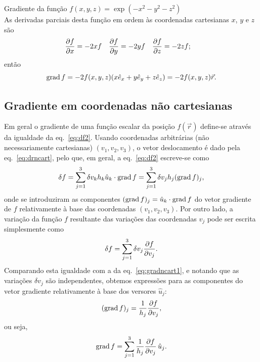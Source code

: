 \begin{examples}
\item Gradiente da função $f(x,y,z)=\exp(-x^2-y^2-z^2)$\\
\label{ex:gausgrad}
As derivadas parciais desta função em ordem às coordenadas cartesianas $x$, $y$
e $z$ são
\begin{align*}
\frac{\partial f}{\partial x}&=-2xf&
\frac{\partial f}{\partial y}&=-2yf&
\frac{\partial f}{\partial z}&=-2zf;
\end{align*}
então
\begin{equation*}
\grad f=-2f(x,y,z)(x\he_x+y\he_y+z\he_z)=-2f(x,y,z)\vec r.
\end{equation*}
\end{examples}

\subsection{Gradiente em coordenadas não cartesianas}
Em geral o gradiente de uma função escalar da posição $f(\vec r)$ define-se
através da igualdade da eq.~\eqref{eq:df2}. Usando coordenadas arbitrárias (não
necessariamente cartesianas) $(v_1,v_2,v_3)$, o vetor deslocamento é dado pela
eq.~\eqref{eq:drncart}, pelo que, em geral, a eq.~\eqref{eq:df2} escreve-se como
\begin{equation}\label{eq:gradncart1}
\delta f=\sum_{j=1}^3\delta v_kh_k\hat u_k\cdot\text{grad}\, f=
\sum_{j=1}^3\delta v_jh_j(\text{grad}\, f)_j,
\end{equation}
onde se introduziram as componentes $(\text{grad}\, f)_j=\hat u_k\cdot\text{grad}\, f$ do vetor
gradiente de $f$ relativamente à base das coordenadas $(v_1,v_2,v_3)$. Por outro
lado, a variação da função $f$ resultante das variações das coordenadas $v_j$
pode ser escrita simplesmente como
\begin{equation}
\delta f=\sum_{j=1}^3\delta v_j\frac{\partial f}{\partial v_j}.
\end{equation}
Comparando esta igualdade com a da eq.~\eqref{eq:gradncart1}, e notando que as
variações $\delta v_j$ são independentes, obtemos expressões para as componentes
do vetor gradiente relativamente à base dos versores $\hat u_j$:
\begin{equation*}
    (\text{grad}\, f)_j=\frac{1}{h_j}\frac{\partial f}{\partial v_j},
\end{equation*}
ou seja,
\begin{equation}\label{eq:gradncart}
\text{grad}\, f=\sum_{j=1}^3\frac{1}{h_j}\frac{\partial f}{\partial v_j}\,\hat u_j.
\end{equation}
